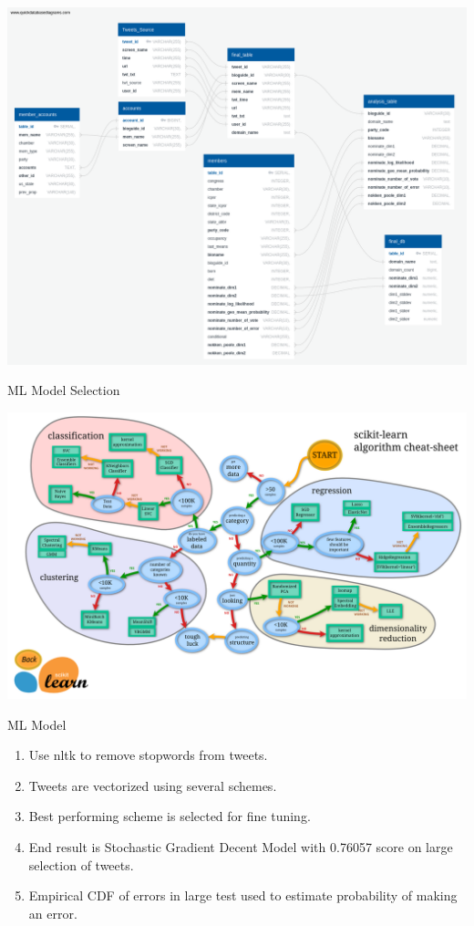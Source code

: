 \documentclass[12pt]{article}
\theoremstyle{example}
\theoremstyle{defn}
\begin{document}
\hspace*{\fill}
\includegraphics[scale=0.13]{QuickDBD-Media_Bias_DB.png}
\hspace*{\fill}

\clearpage

ML Model Selection

\hspace*{\fill}
\includegraphics[scale=0.06]{ml_map.png}
\hspace*{\fill}

\clearpage

ML Model

\vspace*{-10pt}
\begin{enumerate}
\item Use nltk to remove stopwords from tweets.
\item Tweets are vectorized using several schemes.
\item Best performing scheme is selected for fine tuning.
\item End result is Stochastic Gradient Decent Model with 0.76057 score on large selection of tweets.
\item Empirical CDF of errors in large test used to estimate probability of making an error.
\end{enumerate}
\end{document}

